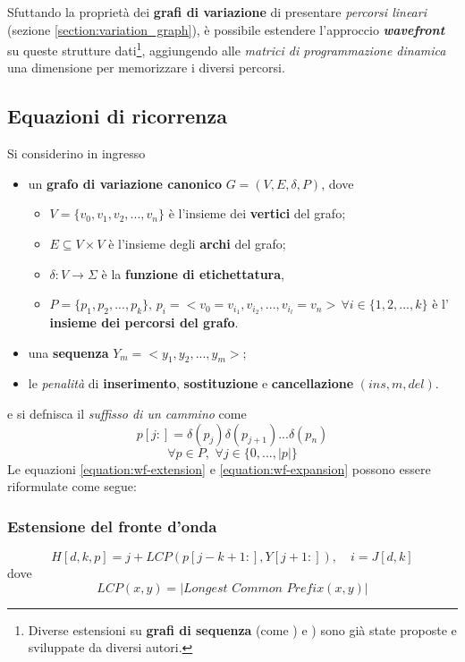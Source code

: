     Sfuttando la proprietà dei \textbf{grafi di variazione} di presentare \emph{percorsi lineari} (sezione \ref{section:variation_graph}), è possibile estendere l'approccio \textbf{\textit{wavefront}} su queste strutture dati\footnote{Diverse estensioni su \textbf{grafi di sequenza} (come \cite{wfa_POA_extension}) e \cite{wfa_sequence_graph}) sono già state proposte e sviluppate da diversi autori.}, aggiungendo alle \emph{matrici di programmazione dinamica} una dimensione per memorizzare i diversi percorsi.

\subsection{Equazioni di ricorrenza}
    Si considerino in ingresso
    \begin{itemize}
        \item un \textbf{grafo di variazione canonico} $G = (V, E, \delta, P)$, dove
        \begin{itemize}
             \item $V = \{v_0, v_1, v_2, ..., v_n\}$ è l'insieme dei \textbf{vertici} del grafo;
            \item  $E \subseteq V \times V$ è l'insieme degli \textbf{archi} del grafo;
            \item $\delta: V \rightarrow \Sigma$ è la \textbf{funzione di etichettatura}, 
            \item $P = \{p_1, p_2, ..., p_k\}, \, p_i = <v_0 = v_{i_1}, v_{i_2}, ..., v_{i_l} = v_n> \, \forall i \in \{1, 2, ..., k\}$ è l' \textbf{insieme dei percorsi del grafo}.  
        \end{itemize}
        \item una \textbf{sequenza} $Y_m = <y_1, y_2, ..., y_m>$;
        \item le \emph{penalità} di \textbf{inserimento}, \textbf{sostituzione} e \textbf{cancellazione }$(ins, m, del)$.
    \end{itemize}
    e si defnisca il \emph{suffisso di un cammino} come
    \begin{equation*}
        p[j:] = \delta(p_j) \delta(p_{j+1}) ... \delta(p_n)
    \end{equation*}
    $$\forall p \in P, \, \, \forall j \in \{0, ..., \lvert p \rvert\}$$
    Le equazioni \ref{equation:wf-extension} e \ref{equation:wf-expansion} possono essere riformulate come segue:
\subsubsection{Estensione del fronte d'onda}
    \begin{equation}
        H[d,k,p] = j + LCP(p[j - k + 1:], Y[j + 1:]), \quad i = J[d,k]
    \label{equation:wf_variation_extension}
    \end{equation}
    dove
    $$LCP(x, y) = \lvert Longest \, \, Common \, \, Prefix(x, y) \rvert$$

